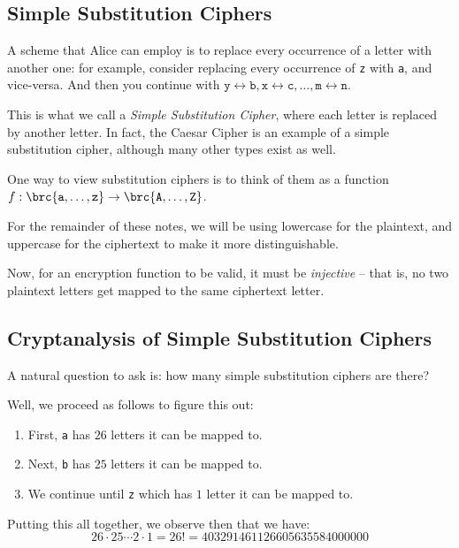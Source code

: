 \documentclass[openany]{book}
\begin{document}
\subsection{Simple Substitution Ciphers}
\begin{example}
	A scheme that Alice can employ is to replace every occurrence of a letter with another one: for example, consider replacing every occurrence of \texttt{z} with \texttt{a}, and vice-versa. And then you continue with $\texttt{y} \leftrightarrow \texttt{b}, \texttt{x} \leftrightarrow \texttt{c}, \ldots, \texttt{m} \leftrightarrow \texttt{n}$.
\end{example}

This is what we call a \textit{Simple Substitution Cipher}, where each letter is replaced by another letter. In fact, the Caesar Cipher is an example of a simple substitution cipher, although many other types exist as well.

One way to view substitution ciphers is to think of them as a function $f : \brc{\texttt{a}, \ldots, \texttt{z}} \rightarrow \brc{\texttt{A}, \ldots, \texttt{Z}}$.

\begin{rmk}
	For the remainder of these notes, we will be using lowercase for the plaintext, and uppercase for the ciphertext to make it more distinguishable.
\end{rmk}

Now, for an encryption function to be valid, it must be \textit{injective} -- that is, no two plaintext letters get mapped to the same ciphertext letter.

\subsection{Cryptanalysis of Simple Substitution Ciphers}
A natural question to ask is: how many simple substitution ciphers are there?

Well, we proceed as follows to figure this out:
\begin{enumerate}
	\item First, \texttt{a} has $26$ letters it can be mapped to.
	\item Next, \texttt{b} has $25$ letters it can be mapped to.
	\item We continue until \texttt{z} which has $1$ letter it can be mapped to.
\end{enumerate}

Putting this all together, we observe then that we have:
\begin{equation*}
	26 \cdot 25 \cdots 2 \cdot 1 = 26! = 403291461126605635584000000
\end{equation*}
\end{document}
